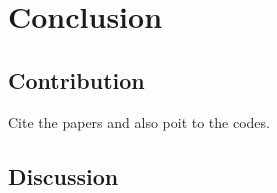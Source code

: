 \chapter{Conclusion} \label{sec:conclusion}

\section{Contribution}

Cite the papers and also poit to the codes.

\section{Discussion}


